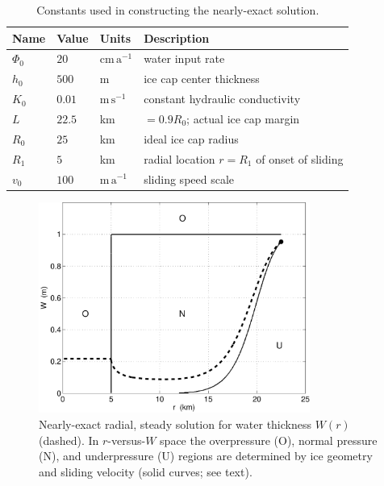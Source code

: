 \documentclass[11pt,final]{amsart}%
\begin{document}
\begin{table}[ht]
  \centering
  \caption{Constants used in constructing the nearly-exact solution.}
  \begin{tabular}{lllp{3.0in}}
    \textbf{Name} & \textbf{Value} & \textbf{Units} & \textbf{Description}\\
\hline
    $\Phi_0$ & $20$ & $\text{cm}\,\text{a}^{-1}$ & water input rate \\
    $h_0$ & $500$ & m & ice cap center thickness \\
    $K_0$ & $0.01$ & $\text{m}\,\text{s}^{-1}$ & constant hydraulic conductivity \\
    $L$   & $22.5$& km & $=0.9 R_0$; actual ice cap margin \\
    $R_0$ & $25$  & km & ideal ice cap radius \\
    $R_1$ & $5$   & km & radial location $r=R_1$ of onset of sliding \\
    $v_0$ & $100$ & $\text{m}\,\text{a}^{-1}$ & sliding speed scale \\
    \hline
  \end{tabular}
 \label{tab:verifconstants}
\end{table}

\begin{figure}[ht]
\includegraphics[width=3.5in,keepaspectratio=true]{exact-W-plot-onu}
\caption{Nearly-exact radial, steady solution for water thickness $W(r)$ (dashed).  In $r$-versus-$W$ space the overpressure (O), normal pressure (N), and underpressure (U) regions are determined by ice geometry and sliding velocity (solid curves; see text).}
\label{fig:Wexact}
\end{figure}
\end{document}
